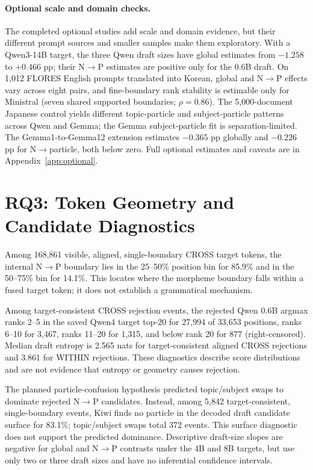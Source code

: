 \documentclass[11pt]{article}
\begin{document}
\paragraph{Optional scale and domain checks.}
The completed optional studies add scale and domain evidence, but their
different prompt sources and smaller samples make them exploratory. With a
Qwen3-14B target, the three Qwen draft sizes have global estimates from
$-1.258$ to $+0.466$ pp; their N$\rightarrow$P estimates are positive only
for the 0.6B draft. On 1,012 FLORES English prompts translated into Korean,
global and N$\rightarrow$P effects vary across eight pairs, and fine-boundary
rank stability is estimable only for Ministral (seven shared supported
boundaries; $\rho=0.86$). The 5,000-document Japanese control yields
different topic-particle and subject-particle patterns across Qwen and Gemma;
the Gemma subject-particle fit is separation-limited. The Gemma1-to-Gemma12 extension estimates
$-0.365$ pp globally and $-0.226$ pp for N$\rightarrow$particle, both below
zero. Full optional estimates and caveats are in Appendix~\ref{app:optional}.

\section{RQ3: Token Geometry and Candidate Diagnostics}
\label{sec:rq3}

Among 168,861 visible, aligned, single-boundary CROSS target tokens, the
internal N$\rightarrow$P boundary lies in the 25--50\% position bin for
85.9\% and in the 50--75\% bin for 14.1\%. This locates where the
morpheme boundary falls within a fused target token; it does not establish a
grammatical mechanism.

Among target-consistent CROSS rejection events, the rejected Qwen 0.6B
argmax ranks 2--5 in the saved Qwen4 target top-20 for 27,994 of 33,653
positions, ranks 6--10 for 3,467, ranks 11--20 for 1,315, and below rank 20
for 877 (right-censored). Median draft entropy is 2.565 nats for
target-consistent aligned CROSS rejections and 3.861 for WITHIN rejections.
These diagnostics describe score distributions and are not evidence that
entropy or geometry causes rejection.

The planned particle-confusion hypothesis predicted topic/subject swaps to
dominate rejected N$\rightarrow$P candidates. Instead, among 5,842
target-consistent, single-boundary events, Kiwi finds no particle in the
decoded draft candidate surface for 83.1\%; topic/subject swaps total 372
events. This surface diagnostic does not support the predicted dominance.
Descriptive draft-size slopes are negative for global and N$\rightarrow$P
contrasts under the 4B and 8B targets, but use only two or three draft sizes
and have no inferential confidence intervals.
\end{document}
